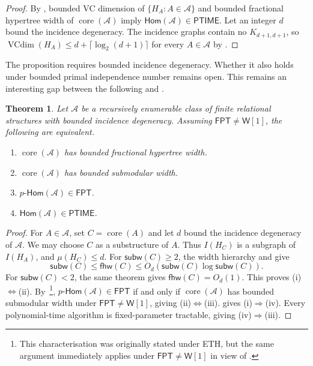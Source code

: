 \documentclass[11pt,letterpaper]{article}
\newtheorem{theorem}{Theorem}[section]
\theoremstyle{definition}
\theoremstyle{remark}
\newcommand{\cA}{\mathcal A}
\newcommand{\Hom}{\mathsf{Hom}}
\newcommand{\pHom}{p\text{-}\mathsf{Hom}}
\newcommand{\fhw}{\mathsf{fhw}}
\newcommand{\subw}{\mathsf{subw}}
\newcommand{\FPT}{\ensuremath{\mathsf{FPT}}}
\newcommand{\PTIME}{\mathsf{PTIME}}
\newcommand{\wone}{\ensuremath{\mathsf{W}[1]}}
\providecommand{\subw}{\operatorname{subw}}
\providecommand{\fhw}{\operatorname{fhw}}
\providecommand{\FPT}{\ensuremath{\mathsf{FPT}}}
\providecommand{\PTIME}{\mathsf{PTIME}}
\begin{document}
\begin{proof}
By \cite[Lemma~2 and Section~4, Corollary~1]{ChenGottlobLanzingerPichler2020},
bounded VC dimension of $\{H_A:A\in\cA\}$ and bounded fractional
hypertree width of $\operatorname{core}(\cA)$ imply $\Hom(\cA)\in\PTIME$.
Let an integer $d$ bound the incidence degeneracy. The incidence graphs
contain no $K_{d+1,d+1}$, so
$\operatorname{VCdim}(H_A)\le d+\lceil\log_2(d+1)\rceil$ for every
$A\in\cA$ by \cite[Table~1 and Appendix~B]{BringmannKozmaMoranNarayanaswamy2016}.
\end{proof}

The proposition requires bounded incidence degeneracy. Whether it also holds under bounded primal independence number remains open.
%
This remains an interesting gap between the following  and .

\begin{theorem}
\label{thm:semantic-incidence-collapse}
Let $\cA$ be a recursively enumerable class of finite relational structures
with bounded incidence degeneracy. Assuming $\FPT\ne \wone$, the following are equivalent.
\begin{enumerate}[label=(\roman*)]
 \item $\operatorname{core}(\cA)$ has bounded fractional hypertree width.
 \item $\operatorname{core}(\cA)$ has bounded submodular width.
 \item $\pHom(\cA)\in\FPT$.
 \item $\Hom(\cA)\in\PTIME$.
\end{enumerate}
\end{theorem}

\begin{proof}
For $A\in\cA$, set $C=\operatorname{core}(A)$ and let $d$ bound the incidence
degeneracy of $\cA$. We may choose $C$ as a substructure of $A$.
Thus $I(H_{C})$ is a subgraph of $I(H_A)$, and
$\mu(H_{C})\le d$.
For $\subw(C)\ge2$, the width hierarchy and  give
\[
 \subw(C)\le\fhw(C)
 \le O_d\!\left(
 \subw(C)\log\subw(C)
 \right).
\]
For $\subw(C)<2$, the same theorem gives $\fhw(C)=O_d(1)$.
This proves (i)$\Leftrightarrow$(ii). By~\cite[Theorem~1 and Lemma~2]{ChenGottlobLanzingerPichler2020}\footnote{This characterisation was originally stated under ETH, but the same argument immediately applies under $\FPT\ne \wone$ in view of .},
$\pHom(\cA)\in\FPT$ if and only if $\operatorname{core}(\cA)$ has bounded
submodular width under $\FPT\ne \wone$, giving (ii)$\Leftrightarrow$(iii).
 gives (i)$\Rightarrow$(iv).
Every polynomial-time algorithm is fixed-parameter tractable, giving
(iv)$\Rightarrow$(iii).
\end{proof}
\end{document}

